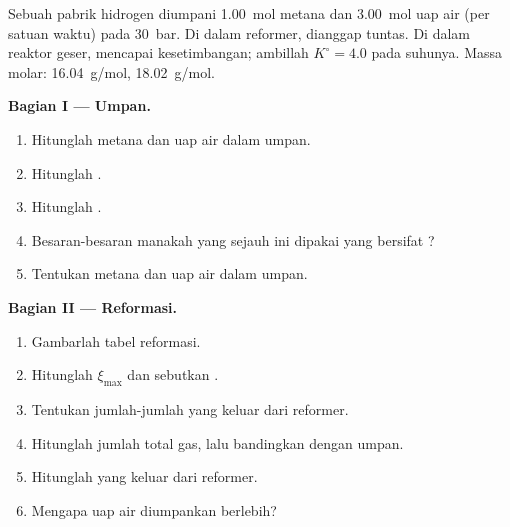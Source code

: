 \begin{problem}
\label{pb:b1:extent-q-and-k:1}
Sebuah pabrik hidrogen diumpani \qty{1.00}{mol} metana dan
\qty{3.00}{mol} uap air (per satuan waktu) pada \qty{30}{bar}. Di dalam
reformer,  dianggap tuntas. Di dalam reaktor
geser,  mencapai kesetimbangan; ambillah
$K^\circ =
4.0$ pada suhunya. Massa molar:  \qty{16.04}{g/mol},
 \qty{18.02}{g/mol}.

\medskip
\noindent\textbf{Bagian I --- Umpan.}
\begin{enumerate}
  \item Hitunglah  metana dan uap air dalam umpan.
  \item Hitunglah .
  \item Hitunglah .
  \item Besaran-besaran manakah yang sejauh ini dipakai yang bersifat
        ?
  \item Tentukan  metana dan uap air dalam umpan.
\end{enumerate}

\medskip
\noindent\textbf{Bagian II --- Reformasi.}
\begin{enumerate}[resume]
  \item Gambarlah tabel  reformasi.
  \item Hitunglah $\xi_{\max}$ dan sebutkan .
  \item Tentukan jumlah-jumlah yang keluar dari reformer.
  \item Hitunglah jumlah total gas, lalu bandingkan dengan umpan.
  \item Hitunglah  yang keluar dari reformer.
  \item Mengapa uap air diumpankan berlebih?
\end{enumerate}


\end{problem}
